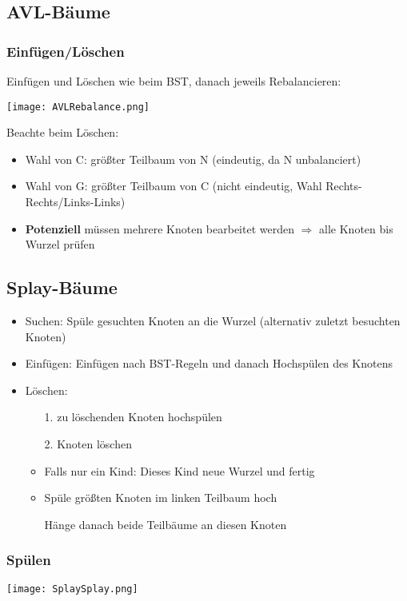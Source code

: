 \subsection*{AVL-Bäume}
\subsubsection*{Einfügen/Löschen}
\centerline{Einfügen und Löschen wie beim BST, danach jeweils Rebalancieren:}
\centerline{\texttt{[image: AVLRebalance.png]}}
Beachte beim Löschen: 
    \begin{itemize}
        \item Wahl von C: größter Teilbaum von N (eindeutig, da N unbalanciert)
        \item Wahl von G: größter Teilbaum von C (nicht eindeutig, Wahl Rechts-Rechts/Links-Links)
        \item \textbf{Potenziell} müssen mehrere Knoten bearbeitet werden $\Rightarrow$ alle Knoten bis Wurzel prüfen
    \end{itemize}

\subsection*{Splay-Bäume}
\begin{itemize}
    \item Suchen: Spüle gesuchten Knoten an die Wurzel (alternativ zuletzt besuchten Knoten)
    \item Einfügen: Einfügen nach BST-Regeln und danach Hochspülen des Knotens
    \item Löschen:
        \begin{itemize}
            \item[1.] zu löschenden Knoten hochspülen
            \item[2.] Knoten löschen
            \item Falls nur ein Kind: Dieses Kind neue Wurzel und fertig
            \item {}  Spüle größten Knoten im linken Teilbaum hoch
            \item[] {\makebox[3cm][l]{}} Hänge danach beide Teilbäume an diesen Knoten
        \end{itemize}
\end{itemize}

\subsubsection*{Spülen}
\centerline{\texttt{[image: SplaySplay.png]}}

